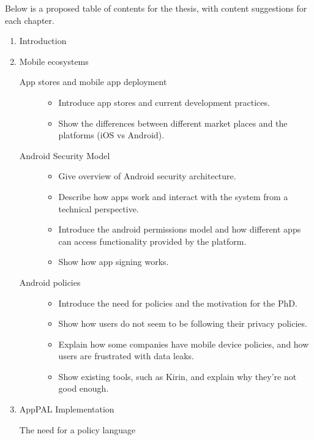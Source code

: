 \documentclass[a4paper]{scrartcl}
\begin{document}
Below is a proposed table of contents for the thesis, with content suggestions for each chapter.
\begin{enumerate}
  \item Introduction
  \item Mobile ecosystems
    \begin{description}
      \item[App stores and mobile app deployment]
        \hfill
        \begin{itemize}
          \item Introduce app stores and current development practices.
          \item Show the differences between different market places and the platforms (iOS vs Android).
        \end{itemize}
      \item[Android Security Model]
        \hfill
        \begin{itemize}
          \item Give overview of Android security architecture.
          \item Describe how apps work and interact with the system from a technical perspective.
          \item Introduce the android permissions model and how different apps can access functionality provided by the platform.
          \item Show how app signing works.
        \end{itemize}
      \item[Android policies]
        \hfill
        \begin{itemize}
          \item Introduce the need for policies and the motivation for the PhD.
          \item Show how users do not seem to be following their privacy policies.
          \item Explain how some companies have mobile device policies, and how users are frustrated with data leaks.
          \item Show existing tools, such as Kirin, and explain why they're not good enough.
        \end{itemize}
    \end{description}
  \item AppPAL Implementation
    \begin{description}
      \item[The need for a policy language]
        \hfill
        \begin{itemize}

\end{itemize}
\end{description}
\end{enumerate}
\end{document}
